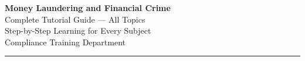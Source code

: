\documentclass[12pt,aspectratio=169]{beamer}
\begin{document}
\begin{frame}
\centering
\vspace{0.8cm}
{\fontsize{20}{24}\selectfont \textbf{Money Laundering and Financial Crime}}\\[0.2cm]
{\fontsize{15}{18}\selectfont Complete Tutorial Guide — All Topics}\\[0.4cm]
{\fontsize{12}{14}\selectfont Step-by-Step Learning for Every Subject}\\[0.4cm]
{\fontsize{10}{12}\selectfont Compliance Training Department}
\vspace{0.3cm}
\rule{5cm}{1pt}
\end{frame}

\end{document}
